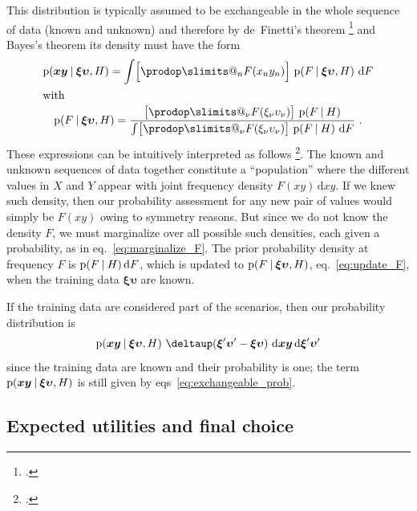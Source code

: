 \documentclass[\ifafour a4paper,12pt,\else a5paper,10pt,\fi%
onecolumn,oneside,article,%
british%
]{memoir}
\makeatletter
\theoremstyle{remark}
\theoremstyle{innote}
\def\prod{\DOTSI\prodop\slimits@}
\newcommand*{\citep}{\footcites}
\newcommand*{\delt}{\deltaup}%
\newcommand*{\di}{\mathrm{d}}%
\newcommand*{\p}{\mathrm{p}}%
\renewcommand*{\|}[1][]{\nonscript\:#1\vert\nonscript\:\mathopen{}}
\renewcommand*{\=}{\TextOrMath\texteq\eq}
\newcommand*{\chap}{ch.}%
\newcommand*{\eqn}{eq.}%
\newcommand*{\eqns}{eqs}%
\newcommand*{\cf}{{cf.}}
\newcommand*{\yx}[1]{x_{#1}}
\newcommand*{\yy}[1]{y_{#1}}
\newcommand*{\bz}{\bm{xy}}
\newcommand*{\yxx}[1]{\xi_{#1}}
\newcommand*{\yyy}[1]{\upsilon_{#1}}
\newcommand*{\bzz}{\bm{\xi\upsilon}}
\newcommand*{\bzzi}{\bm{\xi}'\bm{\upsilon}'}
\makeatother
\begin{document}
This distribution is typically assumed to be exchangeable in the whole
sequence of data (known and unknown) and therefore by de~Finetti's theorem
\citep{definetti1930,definetti1937,hewittetal1955}[\chap~4]{bernardoetal1994_r2000}[for
an insightful summary see]{dawid2013} and Bayes's theorem its density must
have the form
\begin{subequations} \label{eq:exchangeable_prob}
  \begin{gather}
    \label{eq:marginalize_F}
    \p(\bz \| \bzz, H) =
    \int \Bigl[\prod_{n} F(\yx{n}\yy{n})\Bigr] \ \p(F \| \bzz, H)\ \di F
    \\\shortintertext{with}
    \label{eq:update_F}
    \p(F \| \bzz, H) =
    \frac{
      \bigl[\prod_{\nu} F(\yxx{\nu}\yyy{\nu}) \bigr]\ \p(F \| H)
    }{
      \int \bigl[\prod_{\nu} F(\yxx{\nu}\yyy{\nu}) \bigr]\ \p(F \| H)\ \di F
    } \ .
  \end{gather}
\end{subequations}
These expressions can be intuitively interpreted as follows
\citep[\cf][]{lindleyetal1981}. The known and unknown sequences of data
together constitute a \enquote{population} where the different values in
$X$ and $Y$ appear with joint frequency density $F(xy)\,\di xy$. If we knew
such density, then our probability assessment for any new pair of values
would simply be $F(xy)$ owing to symmetry reasons. But since we do not know
the density $F$, we must marginalize over all possible such densities, each
given a probability, as in \eqn~\eqref{eq:marginalize_F}. The prior
probability density at frequency $F$ is $\p(F \| H)\,\di F$, which is
updated to $\p(F \| \bzz, H)$, \eqn~\eqref{eq:update_F}, when the training
data $\bzz$ are known.

If the training data are considered part of the scenarios, then our
probability distribution is
\begin{equation}
  \label{eq:prob_distr_conditional_withtraining}
  \p(\bz \| \bzz, H)\ \delt(\bzzi-\bzz)\ \di\bz\,\di\bzzi
\end{equation}
since the training data are known and their probability is one; the term
$\p(\bz \| \bzz, H)$ is still given by \eqns~\eqref{eq:exchangeable_prob}.




\subsection{Expected utilities and final choice}
\label{sec:expect_utilities}
\end{document}

